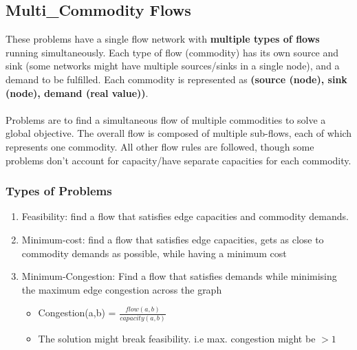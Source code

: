 \subsection{Multi\_Commodity Flows}
These problems have a single flow network with \textbf{multiple types of flows} running simultaneously. Each type of flow (commodity) has its own source and sink (some networks might have multiple sources/sinks in a single node), and a demand to be fulfilled. Each commodity is represented as \textbf{(source (node), sink (node), demand (real value))}.\\ \\
Problems are to find a simultaneous flow of multiple commodities to solve a global objective. The overall flow is composed of multiple sub-flows, each of which represents one commodity. All other flow rules are followed, though some problems don't account for capacity/have separate capacities for each commodity.

\subsubsection{Types of Problems}
\begin{enumerate}
    \item Feasibility: find a flow that satisfies edge capacities and commodity demands.
    \item Minimum-cost: find a flow that satisfies edge capacities, gets as close to commodity demands as possible, while having a minimum cost
    \item Minimum-Congestion: Find a flow that satisfies demands while minimising the maximum edge congestion across the graph
    \begin{itemize}
        \item Congestion(a,b) = $\frac{flow(a,b)}{capacity(a,b)}$
        \item The solution might break feasibility. i.e max. congestion might be $>1$
    \end{itemize}
\end{enumerate}

